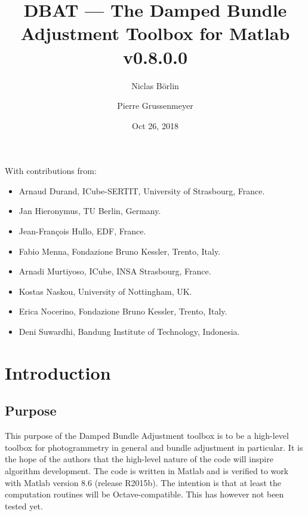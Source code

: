 \documentclass{article}
\begin{document}


\newcommand{\dbatversion}{0.8.0.0}
\newcommand{\dbatdate}{Oct 26, 2018}

\title{DBAT --- The Damped Bundle Adjustment Toolbox for Matlab\\\Large v\dbatversion{}}

\author[1]{Niclas B{\"o}rlin}
\author[2]{Pierre Grussenmeyer}
\date{\dbatdate}

\maketitle

\vfill
With contributions from:
\begin{itemize}
\item Arnaud Durand, ICube-SERTIT, University of Strasbourg, France.
\item Jan Hieronymus, TU Berlin, Germany.
\item Jean-Fran{\c{c}}ois Hullo, EDF, France.
\item Fabio Menna, Fondazione Bruno Kessler, Trento, Italy.
\item Arnadi Murtiyoso, ICube, INSA Strasbourg, France.
\item Kostas Naskou, University of Nottingham, UK.
\item Erica Nocerino, Fondazione Bruno Kessler, Trento, Italy.
\item Deni Suwardhi, Bandung Institute of Technology, Indonesia.
\end{itemize}
\newpage

\tableofcontents

\newpage

\section{Introduction}

\subsection{Purpose}

This purpose of the Damped Bundle Adjustment toolbox is to be a
high-level toolbox for photogrammetry in general and bundle adjustment
in particular. It is the hope of the authors that the high-level
nature of the code will inspire algorithm development. The code is
written in Matlab and is verified to work with Matlab version 8.6
(release R2015b). The intention is that at least the computation
routines will be Octave-compatible. This has however not been tested
yet.
\end{document}
